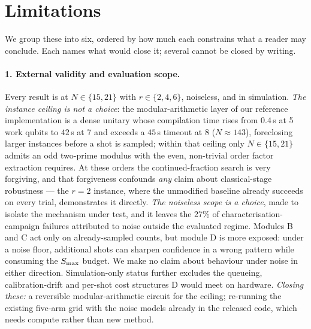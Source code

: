 \section{Limitations}
\label{sec:limitations}

We group these into six, ordered by how much each constrains what a
reader may conclude. Each names what would close it; several cannot be
closed by writing.

\paragraph{1. External validity and evaluation scope.}
Every result is at $N\in\{15,21\}$ with $r\in\{2,4,6\}$, noiseless, and
in simulation. \emph{The instance ceiling is not a choice}: the
modular-arithmetic layer of our reference implementation is a dense
unitary whose compilation time rises from $0.4$\,s at 5 work qubits to
$42$\,s at 7 and exceeds a $45$\,s timeout at 8 ($N\approx143$),
foreclosing larger instances before a shot is sampled; within that
ceiling only $N\in\{15,21\}$ admits an odd two-prime modulus with the
even, non-trivial order factor extraction requires. At these orders the
continued-fraction search is very forgiving, and that forgiveness
confounds \emph{any} claim about classical-stage robustness --- the $r=2$
instance, where the unmodified baseline already succeeds on every trial,
demonstrates it directly. \emph{The noiseless scope is a choice}, made to
isolate the mechanism under test, and it leaves the 27\% of
characterisation-campaign failures attributed to noise outside the
evaluated regime. Modules B and C act only on already-sampled counts, but
module D is more exposed: under a noise floor, additional shots can
sharpen confidence in a wrong pattern while consuming the $S_{\max}$ budget.
We make no claim about behaviour under noise in either direction.
Simulation-only status further excludes the queueing, calibration-drift
and per-shot cost structures D would meet on hardware. \emph{Closing
these:} a reversible modular-arithmetic circuit \cite{cuccaro2004} for
the ceiling; re-running the existing five-arm grid with the noise models
already in the released code, which needs compute rather than new
method.

